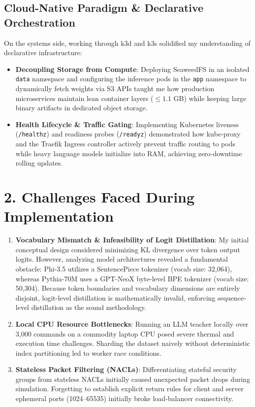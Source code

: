 \documentclass[10pt,a4paper]{article}
\begin{document}
\subsection*{Cloud-Native Paradigm \& Declarative Orchestration}
On the systems side, working through k3d and k3s solidified my understanding of declarative infrastructure:
\begin{itemize}[leftmargin=*,noitemsep]
    \item \textbf{Decoupling Storage from Compute}: Deploying SeaweedFS in an isolated \texttt{data} namespace and configuring the inference pods in the \texttt{app} namespace to dynamically fetch weights via S3 APIs taught me how production microservices maintain lean container layers ($\le 1.1$ GB) while keeping large binary artifacts in dedicated object storage.
    \item \textbf{Health Lifecycle \& Traffic Gating}: Implementing Kubernetes liveness (\texttt{/healthz}) and readiness probes (\texttt{/readyz}) demonstrated how kube-proxy and the Traefik Ingress controller actively prevent traffic routing to pods while heavy language models initialize into RAM, achieving zero-downtime rolling updates.
\end{itemize}

\section*{2. Challenges Faced During Implementation}

\begin{enumerate}[leftmargin=*,itemsep=0.2em]
    \item \textbf{Vocabulary Mismatch \& Infeasibility of Logit Distillation}: My initial conceptual design considered minimizing KL divergence over token output logits. However, analyzing model architectures revealed a fundamental obstacle: Phi-3.5 utilizes a SentencePiece tokenizer (vocab size: 32,064), whereas Pythia-70M uses a GPT-NeoX byte-level BPE tokenizer (vocab size: 50,304). Because token boundaries and vocabulary dimensions are entirely disjoint, logit-level distillation is mathematically invalid, enforcing sequence-level distillation as the sound methodology.
    \item \textbf{Local CPU Resource Bottlenecks}: Running an LLM teacher locally over 3,000 commands on a commodity laptop CPU posed severe thermal and execution time challenges. Sharding the dataset naively without deterministic index partitioning led to worker race conditions.
    \item \textbf{Stateless Packet Filtering (NACLs)}: Differentiating stateful security groups from stateless NACLs initially caused unexpected packet drops during simulation. Forgetting to establish explicit return rules for client and server ephemeral ports (1024--65535) initially broke load-balancer connectivity.
\end{enumerate}
\end{document}
